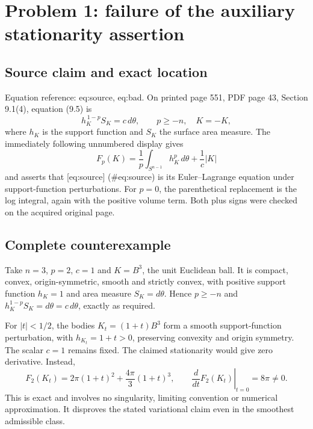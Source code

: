 \documentclass[10pt]{article}
\begin{document}
\section*{Problem 1: failure of the auxiliary stationarity assertion}
\subsection*{Source claim and exact location}
Equation reference: eq:source, eq:bad. On printed page 551, PDF page 43, Section 9.1(4), equation (9.5) is \[h_K^{\,1-p}S_K=c\,d\theta,\qquad p\geq-n,\quad K=-K ,
 \] where \(h_K\) is the support function and \(S_K\) the surface area measure. The immediately following unnumbered display gives \[F_p(K)=\frac1p\int_{S^{n-1}}h_K^p\,d\theta+\frac1c|K|
 \] and asserts that [eq:source] (\#eq:source) is its Euler–Lagrange equation under support-function perturbations. For \(p=0\), the parenthetical replacement is the log integral, again with the positive volume term. Both plus signs were checked on the acquired original page.\par
\subsection*{Complete counterexample}
Take \(n=3\), \(p=2\), \(c=1\) and \(K=B^3\), the unit Euclidean ball. It is compact, convex, origin-symmetric, smooth and strictly convex, with positive support function \(h_K=1\) and area measure \(S_K=d\theta\). Hence \(p\geq-n\) and \(h_K^{1-p}S_K=d\theta=c\,d\theta\), exactly as required.\par
For \(|t|<1/2\), the bodies \(K_t=(1+t)B^3\) form a smooth support-function perturbation, with \(h_{K_t}=1+t>0\), preserving convexity and origin symmetry. The scalar \(c=1\) remains fixed. The claimed stationarity would give zero derivative. Instead, \[F_2(K_t)=2\pi(1+t)^2+\frac{4\pi}{3}(1+t)^3,\qquad
 \left.\frac{d}{dt}F_2(K_t)\right|_{t=0}=8\pi\ne0 .\] This is exact and involves no singularity, limiting convention or numerical approximation. It disproves the stated variational claim even in the smoothest admissible class.\par
\end{document}
